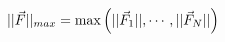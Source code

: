 \documentclass[preview]{standalone}
\begin{document}
\begin{varwidth}{50in}
  \begin{equation}
    || \vec{F} ||_{max} 
    = {\rm max}\left(||\vec{F}_1||, \cdots, ||\vec{F}_N||\right)
    \nonumber
  \end{equation}
\end{varwidth}
\end{document}

